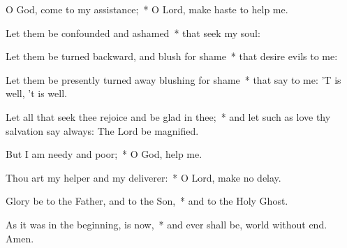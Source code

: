 \begin{enpars}
\item O God, come to my assistance;~* O Lord, make haste to help me.
\item Let them be confounded and ashamed~* that seek my soul:
\item Let them be turned backward, and blush for shame~* that desire evils to me:
\item Let them be presently turned away blushing for shame~* that say to me: 'T is well, 't is well.
\item Let all that seek thee rejoice and be glad in thee;~* and let such as love thy salvation say always: The Lord be magnified.
\item But I am needy and poor;~* O God, help me.
\item Thou art my helper and my deliverer:~* O Lord, make no delay.
\item Glory be to the Father, and to the Son,~* and to the Holy Ghost. 
\item As it was in the beginning, is now,~* and ever shall be, world without end. Amen.
 \end{enpars}